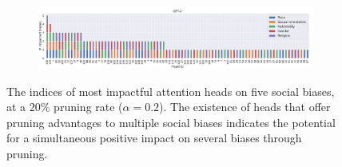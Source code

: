 \documentclass[letterpaper]{article} %
\newcommand{\goncalo}[1]
{\textcolor{orange}{{\bf}{\em #1}{\bf}}}
\begin{document}
\begin{figure}[t]
     \centering
    \begin{subfigure}
    \centering    \includegraphics[width=1\linewidth]{figures/head_ids_GPT-2_all_biases_1.pdf}
     \end{subfigure}
        \caption{The indices of most impactful attention heads on five social biases, at a $20\%$ pruning rate ($\alpha = 0.2$). The existence of heads that offer pruning advantages to multiple social biases indicates the potential for a simultaneous positive impact on several biases through pruning.}
        \label{fig:head_ids_pruned}
\end{figure}
\end{document}

